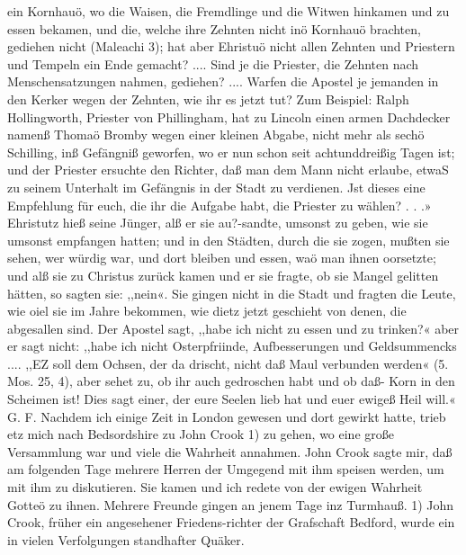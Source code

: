 {%
ein Kornhauö, wo die Waisen, die Fremdlinge und die Witwen
hinkamen und zu essen bekamen, und die, welche ihre Zehnten
nicht inö Kornhauö brachten, gediehen nicht (Maleachi 3); hat
aber Ehristuö nicht allen Zehnten und Priestern und Tempeln
ein Ende gemacht? .... Sind je die Priester, die Zehnten nach
Menschensatzungen nahmen, gediehen? .... Warfen die Apostel
je jemanden in den Kerker wegen der Zehnten, wie ihr es jetzt tut?
Zum Beispiel: Ralph Hollingworth, Priester von Phillingham,
hat zu Lincoln einen armen Dachdecker namenß Thomaö Bromby
wegen einer kleinen Abgabe, nicht mehr als sechö Schilling, inß
Gefängniß geworfen, wo er nun schon seit achtunddreißig Tagen
ist; und der Priester ersuchte den Richter, daß man dem Mann
nicht erlaube, etwaS zu seinem Unterhalt im Gefängnis in der
Stadt zu verdienen. Jst dieses eine Empfehlung für euch, die ihr
die Aufgabe habt, die Priester zu wählen? . . .» Ehristutz hieß
seine Jünger, alß er sie au?-sandte, umsonst zu geben, wie sie
umsonst empfangen hatten; und in den Städten, durch die sie
zogen, mußten sie sehen, wer würdig war, und dort bleiben und
essen, waö man ihnen oorsetzte; und alß sie zu Christus zurück
kamen und er sie fragte, ob sie Mangel gelitten hätten, so sagten
sie: ,,nein«. Sie gingen nicht in die Stadt und fragten die
Leute, wie oiel sie im Jahre bekommen, wie dietz jetzt geschieht
von denen, die abgesallen sind. Der Apostel sagt, ,,habe ich
nicht zu essen und zu trinken?« aber er sagt nicht: ,,habe ich nicht
Osterpfriinde, Aufbesserungen und Geldsummencks .... ,,EZ soll
dem Ochsen, der da drischt, nicht daß Maul verbunden werden«
(5. Mos. 25, 4), aber sehet zu, ob ihr auch gedroschen habt und
ob daß- Korn in den Scheimen ist! Dies sagt einer, der eure
Seelen lieb hat und euer ewigeß Heil will.« G. F.
Nachdem ich einige Zeit in London gewesen und dort gewirkt
hatte, trieb etz mich nach Bedsordshire zu John Crook 1) zu gehen,
wo eine große Versammlung war und viele die Wahrheit annahmen.
John Crook sagte mir, daß am folgenden Tage mehrere Herren
der Umgegend mit ihm speisen werden, um mit ihm zu diskutieren.
Sie kamen und ich redete von der ewigen Wahrheit Gotteö zu
ihnen. Mehrere Freunde gingen an jenem Tage inz Turmhauß.
1) John Crook, früher ein angesehener Friedens-richter der Grafschaft
Bedford, wurde ein in vielen Verfolgungen standhafter Quäker.


}
